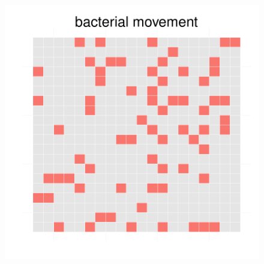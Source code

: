 \begin{figure}[h!]
{\begin{minipage}[t]{0.3\textwidth}
  \end{minipage}
  \begin{minipage}[t]{0.3\textwidth}
    \includegraphics[width=\textwidth]{../results/img/barkeri_beijerinckii_20x20_seed2942_bac150.pdf}
  \end{minipage}
  }
\end{figure}
